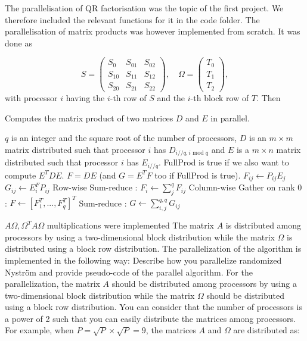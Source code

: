 \documentclass[a4paper, 12pt,oneside]{article}
\begin{document}
	The parallelisation of QR factorisation was the topic of the first project. We therefore included the relevant functions for it in the code folder. The parallelisation of matrix products was however implemented from scratch. It was done as 	
	
	$$
	S=\left(\begin{array}{lll}
	S_{0} & S_{01} & S_{02} \\
	S_{10} & S_{11} & S_{12} \\
	S_{20} & S_{21} & S_{22}
	\end{array}\right), \quad \Omega=\left(\begin{array}{l}
	T_0 \\
	T_1 \\
	T_2
	\end{array}\right),
	$$
	with processor $i$ having the $i$-th row of $S$ and the $i$-th block row of $T$. Then

	\begin{algorithm}
		\caption{Computes the matrix product of two matrices $D$ and $E$ in parallel.}
		\begin{algorithmic}
		\Require $q$ is an integer and the square root of the number of processors, $D$ is an $m\times m$ matrix distributed such that processor $i$ has $D_{i//q,i\text{ mod }q}$ and $E$ is a $m\times n$ matrix distributed such that processor $i$ has $E_{i//q}$. FullProd is true if we also want to compute $E^TDE$.
		\Ensure $F=DE$ (and $G=E^TF$ too if FullProd is true). 
		\State $F_{ij} \gets P_{ij}E_j$
			\State $G_{ij} \gets E_i^FP_{ij}$
		\EndIf		
		\State Row-wise Sum-reduce : $F_i\gets \sum_j^q F_{ij}$
		\State Column-wise Gather on rank 0 : $F\gets [F_1^T,...,F_q^T]^T$
			\State Sum-reduce : $G\gets \sum_{i,j}^{q,q} G_{ij}$
		\EndIf
		\end{algorithmic}
	\end{algorithm}
	$A \Omega,\Omega^T A \Omega$ multiplications were implemented 
	The matrix $A$ is distributed among processors by using a two-dimensional block distribution while the matrix $\Omega$ is distributed using a block row distribution. The parallelization of the algorithm is implemented in the following way:
	Describe how you parallelize randomized Nyström and provide pseudo-code of the parallel algorithm. For the parallelization, the matrix $A$ should be distributed among processors by using a two-dimensional block distribution while the matrix $\Omega$ should be distributed using a block row distribution. You can consider that the number of processors is a power of 2 such that you can easily distribute the matrices among processors. For example, when $P=\sqrt{P} \times \sqrt{P}=9$, the matrices $A$ and $\Omega$ are distributed as:
\end{document}
